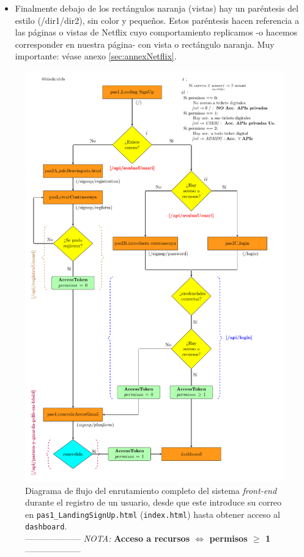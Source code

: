 \documentclass[a4paper,12pt]{report}
\begin{document}
\begin{itemize}
				
		\item Finalmente debajo de los rectángulos naranja (vistas) hay un paréntesis del estilo (/dir1/dir2), sin color y pequeños. Estos paréntesis hacen referencia a las páginas o vistas de Netflix cuyo comportamiento replicamos -o hacemos corresponder en nuestra página- con vista o rectángulo naranja. Muy importante: véase anexo \ref{sec:annexNetflix}.
		
		

		

		

		
	\end{itemize}
	
	
	
	
	\setlength{\belowcaptionskip}{3pt}
	\FloatBarrier
	\begin{figure}[H]
		\centering
		\caption{Diagrama de flujo del enrutamiento completo del sistema \textit{front-end} durante el registro de un usuario, desde que este introduce su correo en \texttt{pas1\_LandingSignUp.html} (\texttt{index.html}) hasta obtener acceso al \texttt{dashboard}.\\ -------------------- \textit{NOTA:} \textbf{Acceso a recursos $\iff$ permisos $\geq$ 1} --------------------}
		\includegraphics[width=1\textwidth]{img/diagramaMercAppFront.pdf}
		
		\label{fig:diagramaMercaAppFront} 
	\end{figure}
\end{document}
